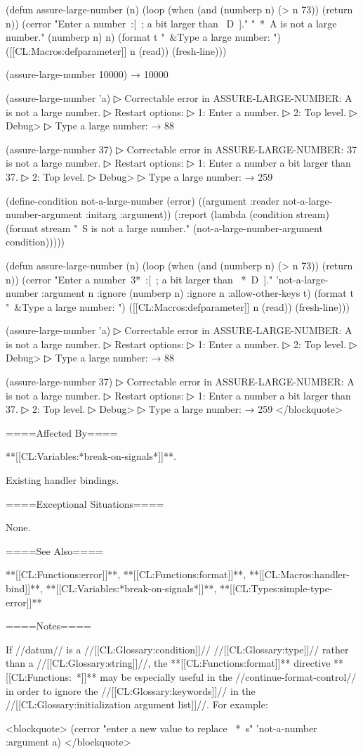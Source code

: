 (defun assure-large-number (n) (loop (when (and (numberp n) (> n 73)) (return n)) (cerror "Enter a number~:[~; a bit larger than ~D~]." "~*~A is not a large number." (numberp n) n) (format t "~&Type a large number: ") ([[CL:Macros:defparameter]] n (read)) (fresh-line)))

(assure-large-number 10000) → 10000

(assure-large-number 'a)
▷ Correctable error in ASSURE-LARGE-NUMBER: A is not a large number.
▷ Restart options:
▷ 1: Enter a number.
▷ 2: Top level.
▷ Debug> 
▷ Type a large number:  → 88

(assure-large-number 37)
▷ Correctable error in ASSURE-LARGE-NUMBER: 37 is not a large number.
▷ Restart options:
▷ 1: Enter a number a bit larger than 37.
▷ 2: Top level.
▷ Debug> 
▷ Type a large number:  → 259

(define-condition not-a-large-number (error) ((argument :reader not-a-large-number-argument :initarg :argument)) (:report (lambda (condition stream) (format stream "~S is not a large number." (not-a-large-number-argument condition)))))

(defun assure-large-number (n) (loop (when (and (numberp n) (> n 73)) (return n)) (cerror "Enter a number~3*~:[~; a bit larger than ~*~D~]." 'not-a-large-number :argument n :ignore (numberp n) :ignore n :allow-other-keys t) (format t "~&Type a large number: ") ([[CL:Macros:defparameter]] n (read)) (fresh-line)))


(assure-large-number 'a)
▷ Correctable error in ASSURE-LARGE-NUMBER: A is not a large number.
▷ Restart options:
▷ 1: Enter a number.
▷ 2: Top level.
▷ Debug> 
▷ Type a large number:  → 88

(assure-large-number 37)
▷ Correctable error in ASSURE-LARGE-NUMBER: A is not a large number.
▷ Restart options:
▷ 1: Enter a number a bit larger than 37.
▷ 2: Top level.
▷ Debug> 
▷ Type a large number:  → 259 </blockquote>

====Affected By====

**[[CL:Variables:*break-on-signals*]]**.

Existing handler bindings.

====Exceptional Situations====

None.

====See Also====

**[[CL:Functions:error]]**, **[[CL:Functions:format]]**, **[[CL:Macros:handler-bind]]**, **[[CL:Variables:*break-on-signals*]]**, **[[CL:Types:simple-type-error]]**

====Notes====

If //datum// is a //[[CL:Glossary:condition]]// //[[CL:Glossary:type]]// rather than a //[[CL:Glossary:string]]//, the **[[CL:Functions:format]]** directive **[[CL:Functions:~*]]** may be especially useful in the //continue-format-control// in order to ignore the //[[CL:Glossary:keywords]]// in the //[[CL:Glossary:initialization argument list]]//. For example:

<blockquote> (cerror "enter a new value to replace ~*~s" 'not-a-number :argument a) </blockquote>


